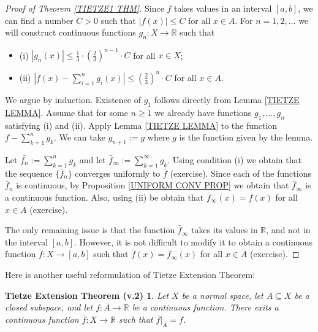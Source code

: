 \documentclass[11pt, letterpaper, oneside]{report}
\theoremstyle{pplain}
\newtheorem{TIETZE2}[theorem]{Tietze Extension Theorem (v.2)}
\newtheorem{ITERMVALUE THM}[theorem]{Intermediate Value Theorem}
\newtheorem{HEINEBOREL THM}[theorem]{Heine-Borel Theorem}
\newtheorem{UMETR THM}[theorem]{Urysohn Metrization Theorem}
\newtheorem{UMETR2 THM}[theorem]{Urysohn Metrization Theorem (v.2)}
\theoremstyle{ddefinition}
\theoremstyle{nnn}
\newtheorem{TDA NN}[theorem]{Topological Data Analysis. }
\theoremstyle{eexercise}
\newcommand{\R}{{\mathbb R}}
\newcommand{\bit}{\begin{itemize}}
\newcommand{\eit}{\end{itemize}}
\begin{document}
\begin{proof}[Proof of Theorem \ref{TIETZE1 THM}]
Since $f$ takes values in an interval $[a, b]$, we can find a number $C > 0$ such that $|f(x)| \leq C$ for 
all $x\in A$. For  $n=1, 2, \dots$ we will construct  continuous functions $g_{n}\colon X\to \R$ such that 
\bit
\item[(i)] $|g_{n}(x)| \leq \frac{1}{3}\cdot \left( \frac{2}{3}\right)^{n-1}\cdot C$ for all $x\in X$;
\item[(ii)] $\left| f(x) - \sum_{i=1}^{n}g_{i}(x) \right| \leq \left(\frac{2}{3}\right)^{n}\cdot C$ for all $x\in A$.
\eit
We argue by induction. Existence of $g_{1}$ follows directly from Lemma \ref{TIETZE LEMMA}. 
Assume that for some $n\geq 1$ we already have functions $g_{1}, \dots, g_{n}$ satisfying 
(i) and (ii). Apply Lemma \ref{TIETZE LEMMA} to the function $ f-\sum_{k=1}^{n} g_{k}$. 
We can take $g_{n+1} := g$ where $g$ is the function  given by the lemma. 

Let $\bar{f_{n}} := \sum_{k=1}^{n} g_{k}$ and let $\bar{f}_{\infty} := \sum_{k=1}^{\infty} g_{k}$. Using 
condition (i) we obtain that the sequence $\{\bar{f}_{n}\}$ converges uniformly to $\bar{f}$
(exercise). Since each of the functions $\bar{f}_{n}$ is continuous, by Proposition 
\ref{UNIFORM CONV PROP} we obtain that $\bar{f}_{\infty}$ is a continuous function. Also, using (ii)
be obtain that $\bar{f}_{\infty}(x) = f(x)$ for all $x\in A$ (exercise).  

The only remaining issue is that the function $\bar{f}_{\infty}$ takes its values in $\R$, and not in the interval 
$[a, b]$. However, it is not difficult to modify it to obtain a continuous function $\bar{f}\colon X \to [a, b]$ such that 
$\bar{f}(x) = \bar{f}_{\infty}(x)$ for all $x\in A$ (exercise).  
\end{proof}


Here is another useful reformulation of Tietze Extension Theorem: 

\begin{TIETZE2}
\label{TIETZE2 THM}
Let $X$ be a normal space, let $A\subseteq X$ be a closed subspace, and let 
$f\colon A\to \R$ be a continuous function. There exits a continuous function 
$\bar{f}\colon X \to \R$ such that $\bar{f}|_{A} = f$. 
\end{TIETZE2}  
 
\end{document}

